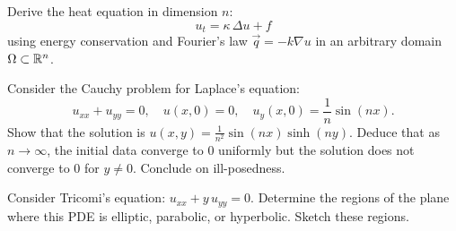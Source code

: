\begin{exercise}
Derive the heat equation in dimension $n$:
\[
    u_t = \kappa\, \Delta u + f
\]
using energy conservation and Fourier's law $\vec{q} = -k \nabla u$ in
an arbitrary domain $\Omega \subset \mathbb{R}^n$.
\end{exercise}

\begin{exercise}
Consider the Cauchy problem for Laplace's equation:
\[
    u_{xx} + u_{yy} = 0, \quad u(x,0) = 0, \quad
    u_y(x,0) = \frac{1}{n}\sin(nx).
\]
Show that the solution is $u(x,y) = \frac{1}{n^2}\sin(nx)\sinh(ny)$.
Deduce that as $n \to \infty$, the initial data converge to $0$
uniformly but the solution does not converge to $0$ for $y \neq 0$.
Conclude on ill-posedness.
\end{exercise}

\begin{exercise}
Consider Tricomi's equation: $u_{xx} + y\, u_{yy} = 0$.
Determine the regions of the plane where this PDE is elliptic,
parabolic, or hyperbolic. Sketch these regions.
\end{exercise}
